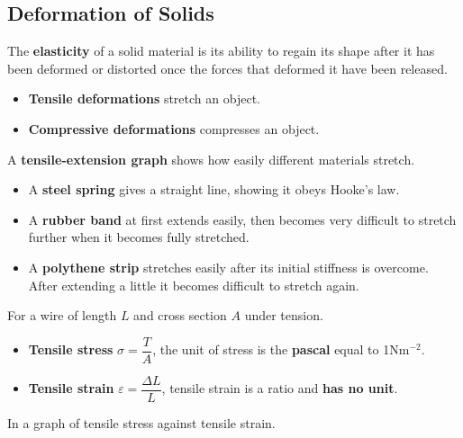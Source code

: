 \subsection{Deformation of Solids}

The \textbf{elasticity} of a solid material is its ability to regain its shape after it has been deformed or distorted once the forces that deformed it have been released.
\begin{itemize}
    \item \textbf{Tensile deformations} stretch an object.
    \item \textbf{Compressive deformations} compresses an object.
\end{itemize}

A \textbf{tensile-extension graph} shows how easily different materials stretch.
\begin{itemize}
    \item A \textbf{steel spring} gives a straight line, showing it obeys Hooke's law.
    \item A \textbf{rubber band} at first extends easily, then becomes very difficult to stretch further when it becomes fully stretched.
    \item A \textbf{polythene strip} stretches easily after its initial stiffness is overcome. After extending a little it becomes difficult to stretch again.
\end{itemize}

For a wire of length $L$ and cross section $A$ under tension.
\begin{itemize}
    \item \textbf{Tensile stress} $\sigma=\dfrac{T}{A}$, the unit of stress is the \textbf{pascal} equal to 1Nm$^{-2}$.
    \item \textbf{Tensile strain} $\varepsilon=\dfrac{\Delta L}{L}$, tensile strain is a ratio and \textbf{has no unit}.
\end{itemize}

In a graph of tensile stress against tensile strain.

